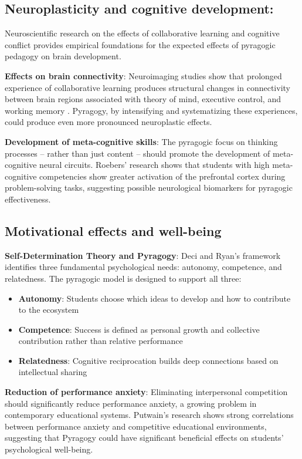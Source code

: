 \subsection*{Neuroplasticity and cognitive development:}

Neuroscientific research on the effects of collaborative learning and cognitive conflict provides empirical foundations for the expected effects of pyragogic pedagogy on brain development.

\textbf{Effects on brain connectivity}:
Neuroimaging studies show that prolonged experience of collaborative learning produces structural changes in connectivity between brain regions associated with theory of mind, executive control, and working memory \cite{Schilbach2013}. Pyragogy, by intensifying and systematizing these experiences, could produce even more pronounced neuroplastic effects.

\textbf{Development of meta-cognitive skills}:
The pyragogic focus on thinking processes -- rather than just content -- should promote the development of meta-cognitive neural circuits. Roebers' \cite{Roebers2017} research shows that students with high meta-cognitive competencies show greater activation of the prefrontal cortex during problem-solving tasks, suggesting possible neurological biomarkers for pyragogic effectiveness.

\subsection{Motivational effects and well-being}

\textbf{Self-Determination Theory and Pyragogy}:
Deci and Ryan's \cite{Deci2000} framework identifies three fundamental psychological needs: autonomy, competence, and relatedness. The pyragogic model is designed to support all three:

\begin{itemize}
	\item \textbf{Autonomy}: Students choose which ideas to develop and how to contribute to the ecosystem
	\item \textbf{Competence}: Success is defined as personal growth and collective contribution rather than relative performance
	\item \textbf{Relatedness}: Cognitive reciprocation builds deep connections based on intellectual sharing
\end{itemize}

\textbf{Reduction of performance anxiety}:
Eliminating interpersonal competition should significantly reduce performance anxiety, a growing problem in contemporary educational systems. Putwain's \cite{Putwain2019} research shows strong correlations between performance anxiety and competitive educational environments, suggesting that Pyragogy could have significant beneficial effects on students' psychological well-being.

